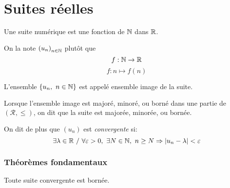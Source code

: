 \documentclass[../main.tex]{subfile}
\begin{document}
\part{Suites réelles}

\begin{defi}
	Une suite numérique est une fonction de $\mathbb{N}$ dans $\mathbb{R}$. 
\end{defi}

\begin{nota}
	On la note $\left( u_n \right)_{n \in \mathbb{N}}$ plutôt que 
	$$f: \mathbb{N} \to \mathbb{R}$$
	$$f: n \mapsto f(n)$$
\end{nota}

\begin{defi}
	L'ensemble $\{u_n, \ n \in \mathbb{N}\}$ est appelé ensemble image de la suite.
\end{defi}

\begin{defi}
	Lorsque l'ensemble image est majoré, minoré, ou borné dans une partie de $(\mathcal{R}, \leq)$, on dit que la suite est majorée, minorée, ou bornée.
\end{defi}

\begin{defi}
	On dit de plus que $(u_n)$ est \emph{convergente} si:
	$$\exists \lambda \in \RR \ / \ \forall \varepsilon > 0, \ \exists N \in \NN, \ n \geq N \Rightarrow |u_n - \lambda| < \varepsilon$$
\end{defi}

\section{Théorèmes fondamentaux} 

\begin{theo}
	Toute suite convergente est bornée.
\end{theo}
\end{document}
